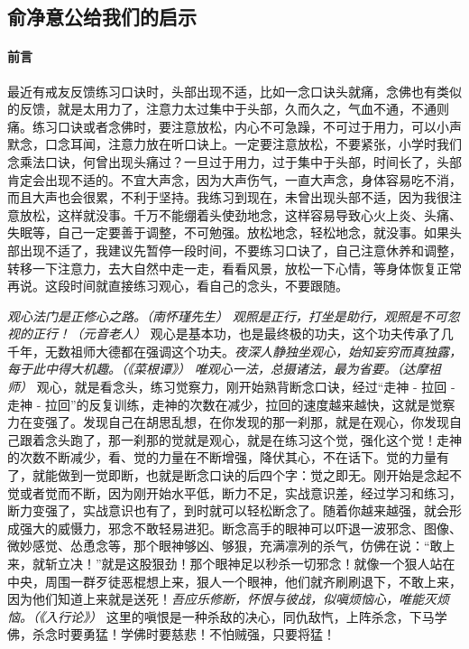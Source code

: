 \subsection{俞净意公给我们的启示}

\paragraph{前言}

最近有戒友反馈练习口诀时，头部出现不适，比如一念口诀头就痛，念佛也有类似的反馈，就是太用力了，注意力太过集中于头部，久而久之，气血不通，不通则痛。练习口诀或者念佛时，要注意放松，内心不可急躁，不可过于用力，可以小声默念，口念耳闻，注意力放在听口诀上。一定要注意放松，不要紧张，小学时我们念乘法口诀，何曾出现头痛过？一旦过于用力，过于集中于头部，时间长了，头部肯定会出现不适的。不宜大声念，因为大声伤气，一直大声念，身体容易吃不消，而且大声也会很累，不利于坚持。我练习到现在，未曾出现头部不适，因为我很注意放松，这样就没事。千万不能绷着头使劲地念，这样容易导致心火上炎、头痛、失眠等，自己一定要善于调整，不可勉强。放松地念，轻松地念，就没事。如果头部出现不适了，我建议先暂停一段时间，不要练习口诀了，自己注意休养和调整，转移一下注意力，去大自然中走一走，看看风景，放松一下心情，等身体恢复正常再说。这段时间就直接练习观心，看自己的念头，不要跟随。

\textit{观心法门是正修心之路。（南怀瑾先生）} \textit{观照是正行，打坐是助行，观照是不可忽视的正行！（元音老人）} 观心是基本功，也是最终极的功夫，这个功夫传承了几千年，无数祖师大德都在强调这个功夫。\textit{夜深人静独坐观心，始知妄穷而真独露，每于此中得大机趣。（《菜根谭》）} \textit{唯观心一法，总摄诸法，最为省要。（达摩祖师）} 观心，就是看念头，练习觉察力，刚开始熟背断念口诀，经过“走神 - 拉回 - 走神 - 拉回”的反复训练，走神的次数在减少，拉回的速度越来越快，这就是觉察力在变强了。发现自己在胡思乱想，在你发现的那一刹那，就是在观心，你发现自己跟着念头跑了，那一刹那的觉就是观心，就是在练习这个觉，强化这个觉！走神的次数不断减少，看、觉的力量在不断增强，降伏其心，不在话下。觉的力量有了，就能做到一觉即断，也就是断念口诀的后四个字：觉之即无。刚开始是念起不觉或者觉而不断，因为刚开始水平低，断力不足，实战意识差，经过学习和练习，断力变强了，实战意识也有了，到时就可以轻松断念了。随着你越来越强，就会形成强大的威慑力，邪念不敢轻易进犯。断念高手的眼神可以吓退一波邪念、图像、微妙感觉、怂恿念等，那个眼神够凶、够狠，充满凛冽的杀气，仿佛在说：“敢上来，就斩立决！”就是这股狠劲！那个眼神足以秒杀一切邪念！就像一个狠人站在中央，周围一群歹徒恶棍想上来，狠人一个眼神，他们就齐刷刷退下，不敢上来，因为他们知道上来就是送死！\textit{吾应乐修断，怀恨与彼战，似嗔烦恼心，唯能灭烦恼。（《入行论》）} 这里的嗔恨是一种杀敌的决心，同仇敌忾，上阵杀念，下马学佛，杀念时要勇猛！学佛时要慈悲！不怕贼强，只要将猛！

